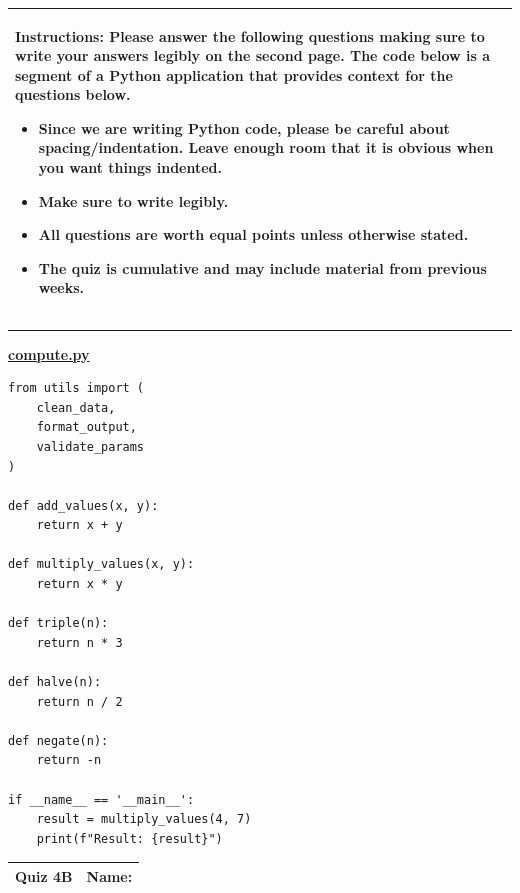 \documentclass[11pt]{article}
\begin{document}
\begin{table}[h]
\centering
{} %
\begin{tabular}{|p{\textwidth}|}
\hline
\begin{minipage}[t]{\textwidth}
\vspace{0pt}  %
\noindent \textbf{Instructions:} Please answer the following questions making sure to write your answers legibly on the second page. The code below is a segment of a Python application that provides context for the questions below.
\begin{itemize}
\item Since we are writing Python code, please be careful about spacing/indentation. Leave enough room that it is obvious when you want things indented. 
\item Make sure to write legibly.
\item All questions are worth equal points unless otherwise stated.
\item The quiz is cumulative and may include material from previous weeks.
\end{itemize}
\end{minipage} 
\\
\hline
\end{tabular}
\end{table}

{\color{lightgray}\hrule}
\vspace{1cm}
\underline{\textbf{compute.py}}
\begin{verbatim}
from utils import (
    clean_data,
    format_output,
    validate_params
)

def add_values(x, y):
    return x + y

def multiply_values(x, y):
    return x * y

def triple(n):
    return n * 3

def halve(n):
    return n / 2

def negate(n):
    return -n

if __name__ == '__main__':
    result = multiply_values(4, 7)
    print(f"Result: {result}")
\end{verbatim}


\clearpage

\begin{tabularx}{\textwidth}{l|X}
\textbf{Quiz 4B} &   \textbf{Name: } \\
\hline
\end{tabularx}
\end{document}
